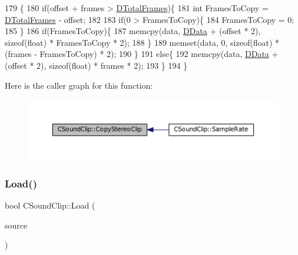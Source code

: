 \begin{DoxyCode}
179                                                                   \{
180     \textcolor{keywordflow}{if}(offset + frames > \hyperlink{classCSoundClip_ab0d9eb261d09fa2a106658276f37285b}{DTotalFrames})\{
181         \textcolor{keywordtype}{int} FramesToCopy = \hyperlink{classCSoundClip_ab0d9eb261d09fa2a106658276f37285b}{DTotalFrames} - offset;
182         
183         \textcolor{keywordflow}{if}(0 > FramesToCopy)\{
184             FramesToCopy = 0;
185         \}
186         \textcolor{keywordflow}{if}(FramesToCopy)\{
187             memcpy(data, \hyperlink{classCSoundClip_a220921a0c81e5c63e2cd3c55c75878b1}{DData} + (offset * 2), \textcolor{keyword}{sizeof}(\textcolor{keywordtype}{float}) * FramesToCopy * 2);
188         \}
189         memset(data, 0, \textcolor{keyword}{sizeof}(\textcolor{keywordtype}{float}) * (frames - FramesToCopy) * 2);
190     \}
191     \textcolor{keywordflow}{else}\{
192         memcpy(data, \hyperlink{classCSoundClip_a220921a0c81e5c63e2cd3c55c75878b1}{DData} + (offset * 2), \textcolor{keyword}{sizeof}(\textcolor{keywordtype}{float}) * frames * 2);
193     \}
194 \}
\end{DoxyCode}
Here is the caller graph for this function\+:\nopagebreak
\begin{figure}[H]
\begin{center}
\leavevmode
\includegraphics[width=350pt]{classCSoundClip_a9cc8dd683c638331b2d0532aa68149da_icgraph}
\end{center}
\end{figure}
\hypertarget{classCSoundClip_a4b8a88d0062844969cbe1ab763c3590a}{}\label{classCSoundClip_a4b8a88d0062844969cbe1ab763c3590a} 
\subsubsection{\texorpdfstring{Load()}{Load()}}
{\footnotesize\ttfamily bool C\+Sound\+Clip\+::\+Load (\begin{DoxyParamCaption}\item[{std\+::shared\+\_\+ptr$<$ \hyperlink{classCDataSource}{C\+Data\+Source} $>$}]{source }\end{DoxyParamCaption})}



